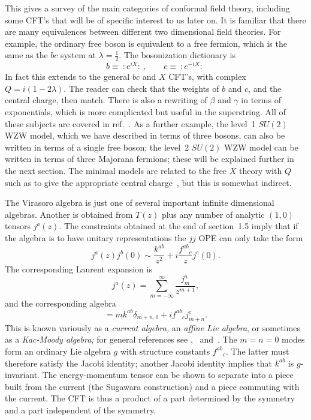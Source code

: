 This gives a survey of the main categories of conformal field
theory, including some CFT's that will be of specific interest to us
later on.  It is familiar that there are many equivalences between
different two dimensional field theories.  For example, the ordinary
free boson is equivalent to a free fermion, which is the same as
the $bc$ system at $\lambda = \frac{1}{2}$.  The
bosonization dictionary is
\begin{equation}
b \equiv\ :\! e^{iX} \! :\ ,\qquad c \equiv\ :\! e^{-iX} \! :\ 
\end{equation}
In fact this extends to the general $bc$ and $X$ CFT's, with
complex $Q = i(1-2\lambda)$.  The reader can check that the weights
of $b$ and $c$, and the central charge, then match.  There is also
a rewriting of $\beta$ and $\gamma$ in terms of exponentials,
which is more complicated but useful in the superstring.
All of these subjects are covered in ref.~\cite{FMS}.
As a further example,
the level~1 $SU(2)$ WZW model, which we have described in terms of
three bosons, can also be written in terms of a single free boson;
the level~2 $SU(2)$ WZW model can be written in terms of three
Majorana fermions; these will be explained further in the next
section. The minimal models are related to the free $X$ theory with
$Q$ such as to give the appropriate central charge~\cite{DotFat}, but
this is somewhat indirect.


The Virasoro algebra is just one of several important infinite
dimensional algebras.  Another is obtained from $T(z)$ plus any
number of analytic $(1,0)$ tensors $j^a(z)$.  The constraints
obtained at the end of section~1.5 imply that if the algebra is to
have unitary representations the $jj$ OPE can only take the form
\begin{equation}
j^a(z) j^b(0) \sim \frac{k^{ab}}{z^2} + i \frac{f^{ab}\!_c}{z}
j^c(0). 
\end{equation}
The corresponding Laurent expansion is
\begin{equation}
j^a(z) =
\sum_{m=-\infty}^{\infty} \frac{j^a_m}{z^{m+1}},
\end{equation}
and the corresponding algebra
\begin{equation}
[j^a_m, j^b_n] = m k^{ab} \delta_{m+n,0} + i f^{ab}\!_c j^c_{m+n}.
\end{equation}
This is known variously as a {\it current algebra,}
an {\it affine Lie algebra}, or
sometimes as a {\it Kac-Moody algebra;}  for general references see
\cite{GO},~\cite{KZ} and~\cite{GepW}.
The $m=n=0$ modes form an ordinary Lie
algebra $g$ with structure constants $f^{ab}\!_c$.  The latter must
therefore satisfy the Jacobi identity; another Jacobi identity
implies that $k^{ab}$ is $g$-invariant.  The energy-momentum tensor
can be shown to separate into a piece built from the current
(the Sugawara construction) and a piece commuting with the current.
The CFT is thus a product of a part determined by the symmetry and
a part independent of the symmetry.

